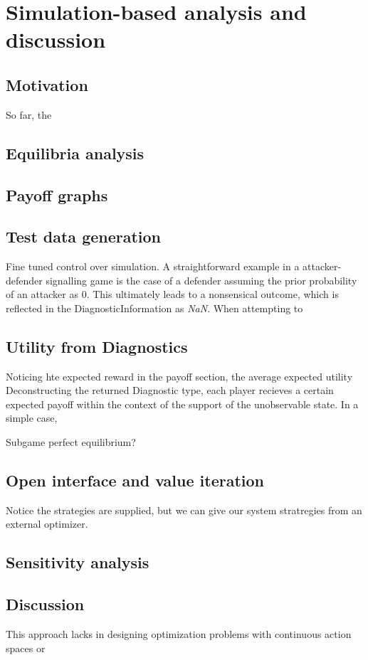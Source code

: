 \section{Simulation-based analysis and discussion}
\label{sec:3}
\subsection{Motivation}
So far, the 
\subsection{Equilibria analysis}
\subsection{Payoff graphs}
\subsection{Test data generation}
Fine tuned control over simulation. A straightforward example in a attacker-defender signalling game is the case of a defender assuming the prior probability of an attacker as 0. This ultimately leads to a nonsensical outcome, which is reflected in the DiagnosticInformation as \textit{NaN}. When attempting to 
\subsection{Utility from Diagnostics}
Noticing hte expected reward in the payoff section, the average expected utility 
Deconstructing the returned Diagnostic type, each player recieves a certain expected payoff within the context of the support of the unobservable state. In a simple case, 


Subgame perfect equilibrium? 

\subsection{Open interface and value iteration}
Notice the strategies are supplied, but we can give our system stratregies from an external optimizer.
\subsection{Sensitivity analysis}
\subsection{Discussion}
This approach lacks in designing optimization problems with continuous action spaces or 
